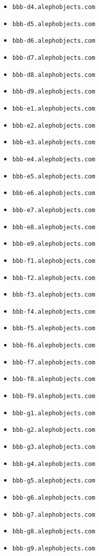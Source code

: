 \begin{itemize}
\item \texttt{bbb-d4.alephobjects.com}
\item \texttt{bbb-d5.alephobjects.com}
\item \texttt{bbb-d6.alephobjects.com}
\item \texttt{bbb-d7.alephobjects.com}
\item \texttt{bbb-d8.alephobjects.com}
\item \texttt{bbb-d9.alephobjects.com}
\item \texttt{bbb-e1.alephobjects.com}
\item \texttt{bbb-e2.alephobjects.com}
\item \texttt{bbb-e3.alephobjects.com}
\item \texttt{bbb-e4.alephobjects.com}
\item \texttt{bbb-e5.alephobjects.com}
\item \texttt{bbb-e6.alephobjects.com}
\item \texttt{bbb-e7.alephobjects.com}
\item \texttt{bbb-e8.alephobjects.com}
\item \texttt{bbb-e9.alephobjects.com}
\item \texttt{bbb-f1.alephobjects.com}
\item \texttt{bbb-f2.alephobjects.com}
\item \texttt{bbb-f3.alephobjects.com}
\item \texttt{bbb-f4.alephobjects.com}
\item \texttt{bbb-f5.alephobjects.com}
\item \texttt{bbb-f6.alephobjects.com}
\item \texttt{bbb-f7.alephobjects.com}
\item \texttt{bbb-f8.alephobjects.com}
\item \texttt{bbb-f9.alephobjects.com}
\item \texttt{bbb-g1.alephobjects.com}
\item \texttt{bbb-g2.alephobjects.com}
\item \texttt{bbb-g3.alephobjects.com}
\item \texttt{bbb-g4.alephobjects.com}
\item \texttt{bbb-g5.alephobjects.com}
\item \texttt{bbb-g6.alephobjects.com}
\item \texttt{bbb-g7.alephobjects.com}
\item \texttt{bbb-g8.alephobjects.com}
\item \texttt{bbb-g9.alephobjects.com}

\end{itemize}
